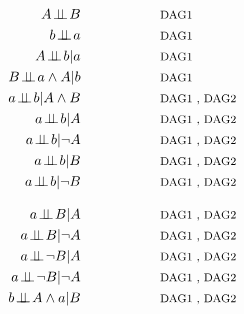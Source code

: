 \documentclass[
  10pt,
  dvipsnames,enabledeprecatedfontcommands]{scrartcl}
\newcommand{\indep}{\!\perp \!\!\! \perp\!}
\newcommand{\n}{\neg}
\newcommand{\et}{\wedge}
\begin{document}
\begin{figure}
\begin{subfigure}[!ht]{0.45\textwidth}
\begin{align} A\indep B  \label{eq:indAB}     &\hspace{2cm}\mbox{\footnotesize DAG1}\\
b \indep a   \label{eq:indab}   & \hspace{2cm}\mbox{\footnotesize DAG1}\\
A \indep b \vert a   \label{eq:I1}    &\hspace{2cm}\mbox{\footnotesize DAG1} \\
B \indep a \et A \vert b \label{eq:I2}&\hspace{2cm}\mbox{\footnotesize DAG1 } \\
a\indep b \vert A\et B \label{eq:I3}  &\hspace{2cm}\mbox{\footnotesize DAG1 , DAG2} \\  
a\indep b \vert A \label{eq:I3a}   &\hspace{2cm}\mbox{\footnotesize DAG1 , DAG2} \\ 
a\indep b \vert \n A \label{eq:I3b}   &\hspace{2cm}\mbox{\footnotesize DAG1 , DAG2} \\ 
a\indep b \vert B \label{eq:I3a2}   &\hspace{2cm}\mbox{\footnotesize DAG1 , DAG2} \\
a\indep b \vert \n B \label{eq:I3b2}   &\hspace{2cm}\mbox{\footnotesize DAG1 , DAG2}
\end{align}
\end{subfigure}
\begin{subfigure}[!ht]{0.5\textwidth}
\begin{align}
a\indep B \vert A \label{eq:I4}    & \hspace{2cm}\mbox{\footnotesize DAG1 , DAG2} \\
a\indep B \vert \n A \label{eq:I4a}    & \hspace{2cm}\mbox{\footnotesize DAG1 , DAG2} \\
a\indep \n B \vert A \label{eq:I4b}   & \hspace{2cm}\mbox{\footnotesize DAG1 , DAG2} \\
a\indep \n B \vert \n A \label{eq:I4c}   & \hspace{2cm}\mbox{\footnotesize DAG1 , DAG2} \\
b\indep A \et a \vert B \label{eq:I5}  & \hspace{2cm}\mbox{\footnotesize DAG1 , DAG2} \\

\end{align}
\end{subfigure}
\end{figure}
\end{document}
